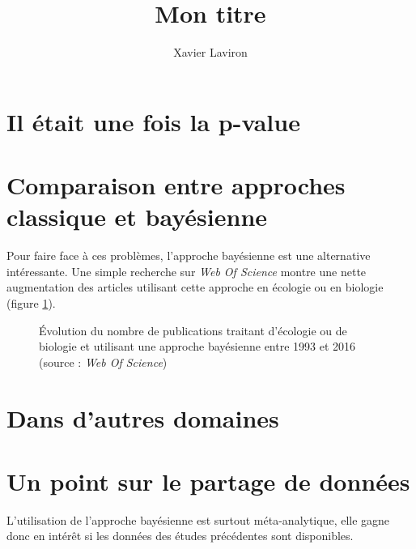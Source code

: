 \documentclass[11pt,twocolumn,twoside]{bopHomework}
\title{Mon titre}
\author[1,*]{Xavier Laviron}
\affil[1]{Presses de Terminus}
\affil[*]{Corresponding author: email@my-email.com}
\begin{document}
\maketitle


\section{Il était une fois la p-value}


\section{Comparaison entre approches classique et bayésienne}

Pour faire face à ces problèmes, l'approche bayésienne est une alternative
intéressante.
Une simple recherche sur \textit{Web Of Science} montre une nette augmentation
des articles utilisant cette approche en écologie ou en biologie (figure
\ref{fig:bibliométrie}).

\begin{figure}[h]
  \centering{\graphfont}
  \caption{Évolution du nombre de publications traitant d'écologie ou de
    biologie et utilisant une approche bayésienne entre 1993 et 2016 (source :
    \textit{Web Of Science})}
  \label{fig:bibliométrie}
\end{figure}


\section{Dans d'autres domaines}


\section{Un point sur le partage de données}

L'utilisation de l'approche bayésienne est surtout méta-analytique, elle gagne
donc en intérêt si les données des études précédentes sont disponibles.


\begin{footnotesize}
  
\end{footnotesize}
\end{document}
